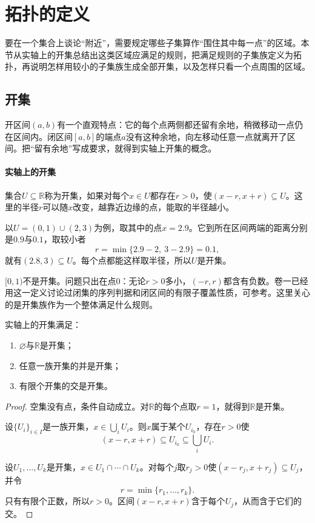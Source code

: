 \section{拓扑的定义}
\label{sec:topo-topology}

要在一个集合上谈论“附近”，需要规定哪些子集算作“围住其中每一点”的区域。本节从实轴上的开集总结出这类区域应满足的规则，把满足规则的子集族定义为拓扑，再说明怎样用较小的子集族生成全部开集，以及怎样只看一个点周围的区域。

\subsection{开集}
\label{sec:topo-open-sets}

开区间$(a,b)$有一个直观特点：它的每个点两侧都还留有余地，稍微移动一点仍在区间内。闭区间$[a,b]$的端点$a$没有这种余地，向左移动任意一点就离开了区间。把“留有余地”写成要求，就得到实轴上开集的概念。

\paragraph{实轴上的开集}
集合$U\subseteq\mathbb R$称为开集，如果对每个$x\in U$都存在$r>0$，使$(x-r,x+r)\subseteq U$。这里的半径$r$可以随$x$改变，越靠近边缘的点，能取的半径越小。

以$U=(0,1)\cup(2,3)$为例，取其中的点$x=2.9$。它到所在区间两端的距离分别是$0.9$与$0.1$，取较小者
\[
 r=\min\{2.9-2,\ 3-2.9\}=0.1,
\]
就有$(2.8,3)\subseteq U$。每个点都能这样取半径，所以$U$是开集。

$[0,1)$不是开集。问题只出在点$0$：无论$r>0$多小，$(-r,r)$都含有负数。卷一已经用这一定义讨论过闭集的序列判据和闭区间的有限子覆盖性质，可参考。这里关心的是开集族作为一个整体满足什么规则。

\begin{lemma}[实轴开集的运算规则]
\label{lem:topo-real-open-rules}
实轴上的开集满足：
\begin{enumerate}
  \item $\varnothing$与$\mathbb R$是开集；
  \item 任意一族开集的并是开集；
  \item 有限个开集的交是开集。
\end{enumerate}
\end{lemma}
\begin{proof}
空集没有点，条件自动成立。对$\mathbb R$的每个点取$r=1$，就得到$\mathbb R$是开集。

设$\{U_i\}_{i\in I}$是一族开集，$x\in\bigcup_iU_i$。则$x$属于某个$U_{i_0}$，存在$r>0$使
\[
 (x-r,x+r)\subseteq U_{i_0}\subseteq\bigcup_iU_i.
\]

设$U_1,\dots,U_k$是开集，$x\in U_1\cap\cdots\cap U_k$。对每个$j$取$r_j>0$使$(x-r_j,x+r_j)\subseteq U_j$，并令
\[
 r=\min\{r_1,\dots,r_k\}.
\]
只有有限个正数，所以$r>0$。区间$(x-r,x+r)$含于每个$U_j$，从而含于它们的交。
\end{proof}

